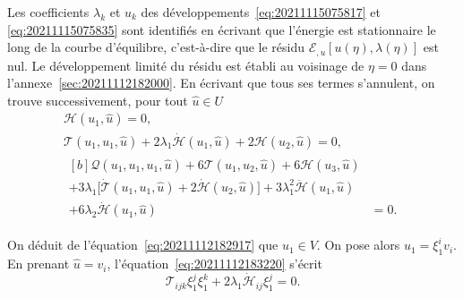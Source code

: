 \documentclass[12pt, final]{amsart}
\begin{document}
Les coefficients \(\lambda_k\) et \(u_k\) des
développements~\eqref{eq:20211115075817} et \eqref{eq:20211115075835} sont
identifiés en écrivant que l'énergie est stationnaire le long de la courbe
d'équilibre, c'est-à-dire que le résidu
\(\mathcal E_{,u}[u(\eta), \lambda(\eta)]\) est nul. Le développement limité du
résidu est établi au voisinage de \(\eta=0\) dans
l'annexe~\ref{sec:20211112182000}. En écrivant que tous ses termes s'annulent,
on trouve successivement, pour tout \(\hat{u}\in U\)
\begin{gather}
  \label{eq:20211112182917}
  \mathcal H(u_1, \hat{u})=0,\\
  \label{eq:20211112183220}
  \mathcal T(u_1, u_1, \hat{u})
  +2\lambda_1\dot{\mathcal H}(u_1, \hat{u})
  +2\mathcal H(u_2, \hat{u})=0,\\
  \begin{aligned}[b]
    \mathcal Q(u_1, u_1, u_1, \hat{u})
    +6\mathcal T(u_1, u_2, \hat{u})+6\mathcal H(u_3, \hat{u})&\\
    +3\lambda_1\bigl[\dot{\mathcal T}(u_1, u_1, \hat{u})
    +2\dot{\mathcal H}(u_2, \hat{u})\bigr]
    +3\lambda_1^2\ddot{\mathcal H}(u_1, \hat{u})&\\
    +6\lambda_2\dot{\mathcal H}(u_1, \hat{u})&=0.
  \end{aligned}
\end{gather}

On déduit de l'équation~\eqref{eq:20211112182917} que \(u_1\in V\). On pose
alors \(u_1=\xi_1^i v_i\). En prenant \(\hat{u}=v_i\),
l'équation~\eqref{eq:20211112183220} s'écrit
\begin{equation}
  \mathcal T_{ijk}\xi_1^j\xi_1^k+2\lambda_1\dot{\mathcal H}_{ij}\xi_1^j=0.
\end{equation}
\end{document}
